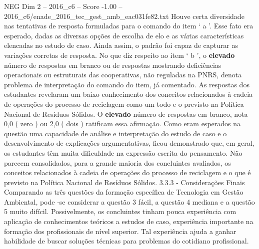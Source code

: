 \begin{textsample}{NEG Dim 2 – 2016\_c6 – Score -1.00 – 2016\_c6/enade\_2016\_tec\_gest\_amb\_eac031fe82.txt}
Houve certa diversidade nas tentativas de resposta formuladas para o comando do item ‘ a ’.
Esse fato era esperado, dadas as diversas opções de escolha de elo e as várias características elencadas no estudo de caso.
Ainda assim, o padrão foi capaz de capturar as variações corretas de resposta.
No que diz respeito ao item ‘ b ’, o \textbf{elevado} número de respostas em branco ou de respostas mostrando deficiências operacionais ou estruturais das cooperativas, não reguladas na PNRS, denota problema de interpretação do comando do item, já comentado.
As respostas dos estudantes revelaram um baixo conhecimento dos conceitos relacionados à cadeia de operações do processo de reciclagem como um todo e o previsto na Política Nacional de Resíduos Sólidos.
O \textbf{elevado} número de respostas em branco, nota 0,0 ( zero ) ou 2,0 ( dois ) ratificam essa afirmação.
Como eram esperados na questão uma capacidade de análise e interpretação do estudo de caso e o desenvolvimento de explicações argumentativas, ficou demonstrado que, em geral, os estudantes têm muita dificuldade na expressão escrita do pensamento.
Não parecem consolidados, para a grande maioria dos concluintes avaliados, os conceitos relacionados à cadeia de operações do processo de reciclagem e o que é previsto na Política Nacional de Resíduos Sólidos. 3.3.3 - Considerações Finais Comparando as três questões da formação específica de Tecnologia em Gestão Ambiental, pode -se considerar a questão 3 fácil, a questão 4 mediana e a questão 5 muito difícil.
Possivelmente, os concluintes tinham pouca experiência com aplicação de conhecimentos teóricos a estudos de caso, experiência importante na formação dos profissionais de nível superior.
Tal experiência ajuda a ganhar habilidade de buscar soluções técnicas para problemas do cotidiano profissional.

\end{textsample}
